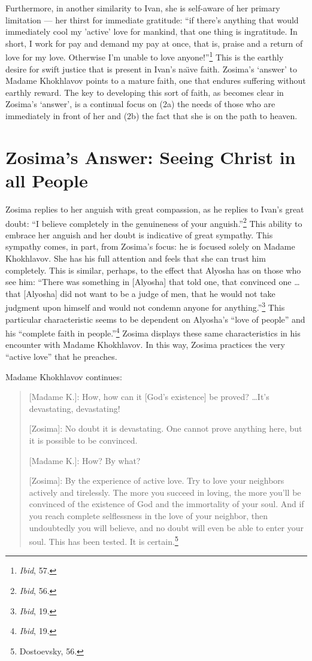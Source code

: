  Furthermore, in another similarity to Ivan, she is self-aware of her primary limitation --- her thirst for immediate gratitude: ``if there's anything that would immediately cool my 'active' love for mankind, that one thing is ingratitude. In short, I work for pay and demand my pay at once, that is, praise and a return of love for my love. Otherwise I'm unable to love anyone!''\footnote{\emph{Ibid}, 57.} This is the earthly desire for swift justice that is present in Ivan's na\"{\i}ve faith. Zosima's `answer' to Madame Khokhlavov points to a mature faith, one that endures suffering without earthly reward. The key to developing this sort of faith, as becomes clear in Zosima's `answer', is a continual focus on (2a) the needs of those who are immediately in front of her and (2b) the fact that she is on the path to heaven.

\section{Zosima's Answer: Seeing Christ in all People}
Zosima replies to her anguish with great compassion, as he replies to Ivan's great doubt: ``I believe completely in the genuineness of your anguish.''\footnote{\emph{Ibid}, 56.} This ability to embrace her anguish and her doubt is indicative of great sympathy. This sympathy comes, in part, from Zosima's focus: he is focused solely on Madame Khokhlavov. She has his full attention and feels that she can trust him completely. This is similar, perhaps, to the effect that Alyosha has on those who see him: ``There was something in [Alyosha] that told one, that convinced one \ldots that [Alyosha] did not want to be a judge of men, that he would not take judgment upon himself and would not condemn anyone for anything.''\footnote{\emph{Ibid}, 19.} This particular characteristic seems to be dependent on Alyosha's ``love of people'' and his ``complete faith in people.''\footnote{\emph{Ibid}, 19.} Zosima displays these same characteristics in his encounter with Madame Khokhlavov. In this way, Zosima practices the very ``active love'' that he preaches.

Madame Khokhlavov continues:
\begin{quote}
[Madame K.]: How, how can it [God's existence] be proved? \ldots It's devastating, devastating!

[Zosima]: No doubt it is devastating. One cannot prove anything here, but it is possible to be convinced.

[Madame K.]: How? By what?

[Zosima]: By the experience of active love. Try to love your neighbors actively and tirelessly. The more you succeed in loving, the more you'll be convinced of the existence of God and the immortality of your soul. And if you reach complete selflessness in the love of your neighbor, then undoubtedly you will believe, and no doubt will even be able to enter your soul. This has been tested. It is certain.\footnote{Dostoevsky, 56.}
\end{quote}

